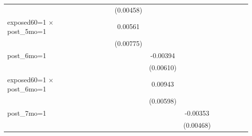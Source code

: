 \begin{table}[htbp]
\begin{tabular}{l*{11}{c}}
                    &                     &                     &                     &   (0.00458)         &                     &                     &                     &                     &                     &                     &                     \\
\addlinespace
exposed60=1 $\times$ post\_5mo=1&                     &                     &                     &     0.00561         &                     &                     &                     &                     &                     &                     &                     \\
                    &                     &                     &                     &   (0.00775)         &                     &                     &                     &                     &                     &                     &                     \\
\addlinespace
post\_6mo=1          &                     &                     &                     &                     &    -0.00394         &                     &                     &                     &                     &                     &                     \\
                    &                     &                     &                     &                     &   (0.00610)         &                     &                     &                     &                     &                     &                     \\
\addlinespace
exposed60=1 $\times$ post\_6mo=1&                     &                     &                     &                     &     0.00943         &                     &                     &                     &                     &                     &                     \\
                    &                     &                     &                     &                     &   (0.00598)         &                     &                     &                     &                     &                     &                     \\
\addlinespace
post\_7mo=1          &                     &                     &                     &                     &                     &    -0.00353         &                     &                     &                     &                     &                     \\
                    &                     &                     &                     &                     &                     &   (0.00468)         &                     &                     &                     &                     &                     \\

\end{tabular}
\end{table}
